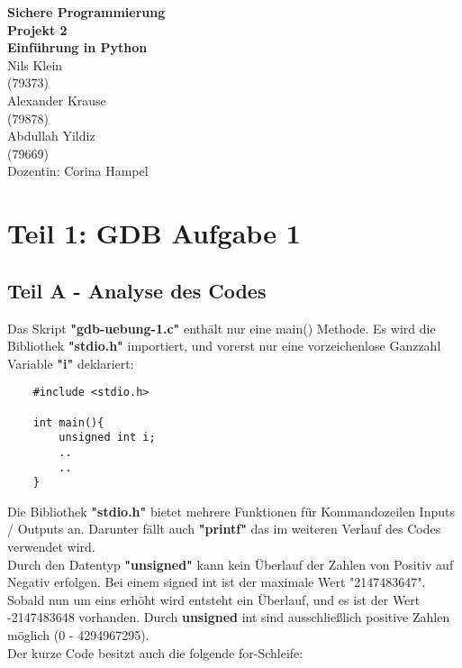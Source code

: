 \documentclass[12pt]{article}
\begin{document}
\begin{center}
  \textbf{\LARGE Sichere Programmierung} \\[1ex]%
  \textbf{\Large Projekt 2}\\[1ex] %
  \textbf{\Large Einführung in Python}\\[3ex] %
  Nils Klein \\ %
  (79373) \\[1ex] %
  Alexander Krause \\ %
  (79878) \\[1ex] %
  Abdullah Yildiz \\ %
  (79669) \\[1ex] %
  Dozentin: Corina Hampel \\%
  
\end{center}


\newpage
\setcounter{page}{2}
\tableofcontents

\newpage
\section{Teil 1: GDB Aufgabe 1}
\subsection{Teil A - Analyse des Codes}
Das Skript \textbf{"gdb-uebung-1.c"} enthält nur eine main() Methode. Es wird die Bibliothek \textbf{"stdio.h"} importiert, und vorerst nur eine vorzeichenlose Ganzzahl Variable \textbf{"i"} deklariert:

\begin{lstlisting}
    #include <stdio.h>
    
    int main(){
        unsigned int i;
        ..
        ..
    }
\end{lstlisting}

Die Bibliothek \textbf{"stdio.h"} bietet mehrere Funktionen für Kommandozeilen Inputs / Outputs an. Darunter fällt auch \textbf{"printf"} das im weiteren Verlauf des Codes verwendet wird.\\
Durch den Datentyp \textbf{"unsigned"} kann kein Überlauf der Zahlen von Positiv auf Negativ erfolgen. Bei einem signed int ist der maximale Wert "2147483647". Sobald nun um eins erhöht wird entsteht ein Überlauf, und es ist der Wert -2147483648 vorhanden. Durch \textbf{unsigned} int sind ausschließlich positive Zahlen möglich (0 - 4294967295).\\
Der kurze Code besitzt auch die folgende for-Schleife:\\
\end{document}
